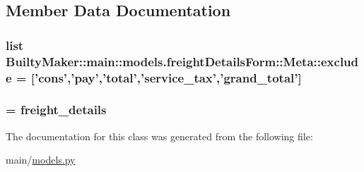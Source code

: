 \subsection{\-Member \-Data \-Documentation}
\hypertarget{classBuiltyMaker_1_1main_1_1models_1_1freightDetailsForm_1_1Meta_a369ceb85911512de5da05ee3524eaccd}{
\subsubsection[{exclude}]{\setlength{\rightskip}{0pt plus 5cm}list {\bf \-Builty\-Maker\-::main\-::models.\-freight\-Details\-Form\-::\-Meta\-::exclude} = \mbox{[}'cons','pay','total','service\-\_\-tax','grand\-\_\-total'\mbox{]}}}\label{classBuiltyMaker_1_1main_1_1models_1_1freightDetailsForm_1_1Meta_a369ceb85911512de5da05ee3524eaccd}
\hypertarget{classBuiltyMaker_1_1main_1_1models_1_1freightDetailsForm_1_1Meta_add8f591c99f14c4747e029bebfe4a133}{
\subsubsection[{model}]{ = {\bf freight\-\_\-details}}}\label{classBuiltyMaker_1_1main_1_1models_1_1freightDetailsForm_1_1Meta_add8f591c99f14c4747e029bebfe4a133}


\-The documentation for this class was generated from the following file\-:\begin{DoxyCompactItemize}
\item 
main/\hyperlink{models_8py}{models.\-py}\end{DoxyCompactItemize}

